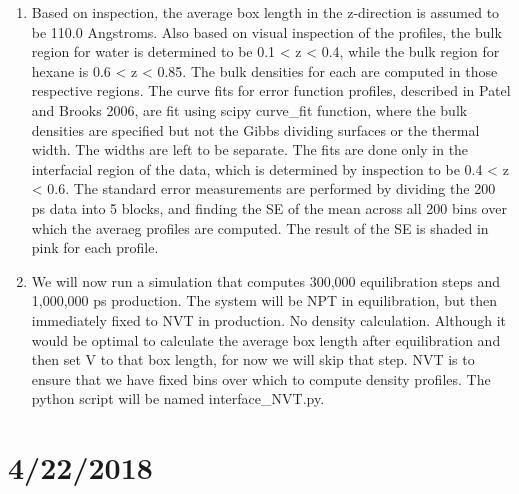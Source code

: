 \documentclass[12pt,reqno]{amsart}
\numberwithin{equation}{section}
\begin{document}
\begin{enumerate}
\item Based on inspection, the average box length in the z-direction is assumed to be 110.0 Angstroms.  Also based on visual inspection of the profiles, the bulk region for water is determined to be 0.1 < z < 0.4, while the bulk region for hexane is 0.6 < z < 0.85.  The bulk densities for each are computed in those respective regions.  The curve fits for error function profiles, described in Patel and Brooks 2006, are fit using scipy curve\_fit function, where the bulk densities are specified but not the Gibbs dividing surfaces or the thermal width.  The widths are left to be separate.  The fits are done only in the interfacial region of the data, which is determined by inspection to be 0.4 < z < 0.6.  The standard error measurements are performed by dividing the 200 ps data into 5 blocks, and finding the SE of the mean across all 200 bins over which the averaeg profiles are computed.  The result of the SE is shaded in pink for each profile.  

\item We will now run a simulation that computes 300,000 equilibration steps and 1,000,000 ps production.  The system will be NPT in equilibration, but then immediately fixed to NVT in production.  No density calculation.  Although it would be optimal to calculate the average box length after equilibration and then set V to that box length, for now we will skip that step.  NVT is to ensure that we have fixed bins over which to compute density profiles.  The python script will be named interface\_NVT.py.  


\end{enumerate}

\section{4/22/2018}
\end{document}
